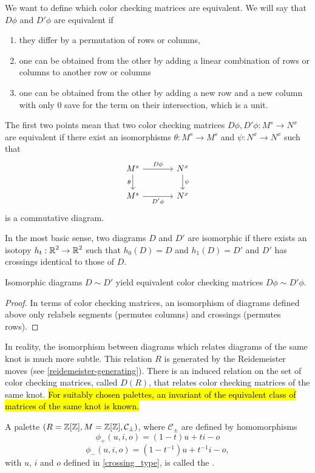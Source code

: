 We want to define which color checking matrices are equivalent. We will say that $D\phi$ and $D'\phi$ are equivalent if 
\begin{enumerate}
  \item they differ by a permutation of rows or columns, 
  \item one can be obtained from the other by adding a linear combination of rows or columns to another row or columns 
  \item one can be obtained from the other by adding a new row and a new column with only $0$ save for the term on their intersection, which is a unit.
\end{enumerate}
The first two points mean that two color checking matrices $D\phi, D'\phi:M^s\to N^x$ are equivalent if there exist an isomorphisms $\theta:M^s\to M^s$ and $\psi:N^x\to N^x$ such that
$$
\begin{tikzcd}[column sep=large]
  M^s\arrow[r, "D\phi"]\arrow[d, "\theta" left] & N^x\arrow[d, "\psi" right]\\ 
  M^s\arrow[r, "D'\phi" below] & N^x
\end{tikzcd}
$$
is a commutative diagram. 

In the most basic sense, two diagrams $D$ and $D'$ are isomorphic if there exists an isotopy $h_t:\operatorname{\mathbb{R}}^2\to \operatorname{\mathbb{R}}^2$ such that $h_0(D)=D$ and $h_1(D)=D'$ and $D'$ has crossings identical to those of $D$.

\begin{lemma}
  Isomorphic diagrams $D\sim D'$ yield equivalent color checking matrices $D\phi\sim D'\phi$.
\end{lemma}

\begin{proof}
  In terms of color checking matrices, an isomorphism of diagrams defined above only relabels segments (permutes columns) and crossings (permutes rows).
\end{proof}

In reality, the isomorphism between diagrams which relates diagrams of the same knot is much more subtle. This relation $R$ is generated by the Reidemeister moves (see \cref{reidemeister-generating}). There is an induced relation on the set of color checking matrices, called $D(R)$, that relates color checking matrices of the same knot. 
\hl{For suitably chosen palettes, an invariant of the equivalent class of matrices of the same knot is known.} 

\begin{definition}
A palette {\boldmath$(R=\operatorname{\mathbb{Z}}[\operatorname{\mathbb{Z}}], M=\operatorname{\mathbb{Z}}[\operatorname{\mathbb{Z}}], \mathcal{C}_\pm)$}, where $\mathcal{C}_\pm$ are defined by homomorphisms
$$\phi_+(u,i,o)=(1-t)u+ti-o$$
$$\phi_-(u,i,o)=(1-t^{-1})u+t^{-1}i-o,$$
with $u$, $i$ and $o$ defined in \cref{crossing_type}, is called the .
\end{definition}

